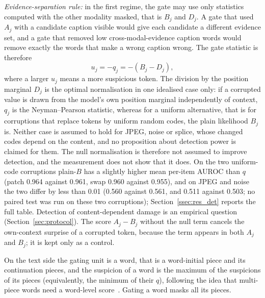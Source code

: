 \emph{Evidence-separation rule:} in the first regime, the gate may use only statistics computed with the other modality
masked, that is $B_j$ and $D_j$.
A gate that used $A_j$ with a candidate caption visible would give each candidate a different evidence set, and a gate that removed
low cross-modal-evidence caption words would remove exactly the words that make a wrong caption wrong.
The gate statistic is therefore
\begin{equation}
u_j=-q_j=-(B_j-D_j),
\label{eq:suspicion}
\end{equation}
where a larger $u_j$ means a more suspicious token.
The division by the position marginal $D_j$ is the optimal normalisation in one idealised case only: if a corrupted value is
drawn from the model's own position marginal independently of context, $q_j$ is the Neyman--Pearson statistic, whereas for
a uniform alternative, that is for corruptions that replace tokens by uniform random codes, the plain likelihood $B_j$ is.
Neither case is assumed to hold for JPEG, noise or splice, whose changed codes depend on the content, and no proposition about
detection power is claimed for them.
The null normalisation is therefore not assumed to improve detection, and the measurement does not show that it does.
On the two uniform-code corruptions plain-$B$ has a slightly higher mean per-item AUROC than $q$ (patch 0.964 against 0.961,
swap 0.960 against 0.955), and on JPEG and noise the two differ by less than 0.01 (0.560 against 0.561, and 0.511 against 0.503;
no paired test was run on these two corruptions); Section~\ref{ssec:res_det} reports the full table.
Detection of content-dependent damage is an empirical question (Section~\ref{sec:protocol}).
The score $A_j-B_j$ without the null term cancels the own-context surprise of a corrupted token, because the term appears in
both $A_j$ and $B_j$; it is kept only as a control.

On the text side the gating unit is a word, that is a word-initial piece and its continuation pieces, and the suspicion of a
word is the maximum of the suspicions of its pieces (equivalently, the minimum of their $q$), following the idea that
multi-piece words need a word-level score~\citep{kauf2023plwl2r}.
Gating a word masks all its pieces.

\begin{algorithm}[t]
\caption{\textsc{ReliabilityScores}: suspicion of every token of one modality}\label{alg:reliability}
\end{algorithm}

